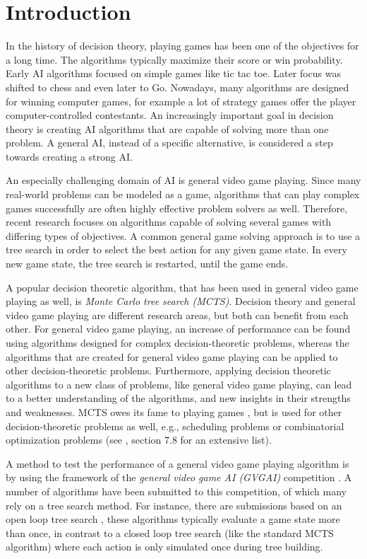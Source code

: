 \chapter{Introduction}
\label{sec:introduction}

In the history of decision theory, playing games has been one of the objectives
for a long time. The algorithms typically maximize their score or win
probability. Early AI algorithms focused on simple games like tic tac toe.
Later focus was shifted to chess and even later to Go. Nowadays, many algorithms
are designed for winning computer games, for example a lot of strategy games
offer the player computer-controlled contestants. 
An increasingly important goal in decision theory is creating AI algorithms that
are capable of solving more than one problem. A general AI, instead of a
specific alternative, is considered a step towards creating a strong AI.

An especially challenging domain of AI is general video game playing.  Since
many real-world problems can be modeled as a game, algorithms that can play
complex games successfully are often highly effective problem solvers as well.
Therefore, recent research focuses on algorithms capable of solving several
games with differing types of objectives. A common general game solving approach
is to use a tree search in order to select the best action for any given game
state. In every new game state, the tree search is restarted, until the game
ends. 

A popular decision theoretic algorithm, that has been used in general video game
playing as well, is \emph{Monte Carlo tree search (MCTS)}. Decision theory and
general video game playing are different research areas, but both can benefit
from each other. For general video game playing, an increase of performance can
be found using algorithms designed for complex decision-theoretic problems,
whereas the algorithms that are created for general video game playing can be
applied to other decision-theoretic problems.  Furthermore, applying decision
theoretic algorithms to a new class of problems, like general video game
playing, can lead to a better understanding of the algorithms, and new insights
in their strengths and weaknesses.  MCTS owes its fame to playing games
\cite{gelly2006modification}, but is used for other decision-theoretic problems
as well, e.g., scheduling problems or combinatorial optimization problems (see
\cite{browne2012survey}, section 7.8 for an extensive list). 

A method to test the performance of a general video game playing algorithm is
by using the framework of the \emph{general video game AI (GVGAI)} competition
\cite{perez2014}.  A number of algorithms have been submitted to this competition,
of which many rely on a tree search method. For instance, there are submissions
based on an open loop tree search \cite{perez2015open}, these algorithms
typically evaluate a game state more than once, in contrast to a closed loop
tree search (like the standard MCTS algorithm) where each action is only
simulated once during tree building. 

